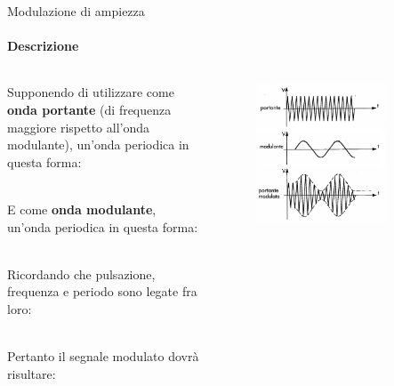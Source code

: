 \documentclass[aspectratio=169]{beamer}
\newcommand*{\vet}{\fontfamily{qzc}\selectfont}
\begin{document}
\begin{frame}{Modulazione di ampiezza}
	\framesubtitle{Descrizione}
	
	\begin{columns}
		\begin{column}{0.6\textwidth}
			Supponendo di utilizzare come \textbf{onda portante} (di frequenza maggiore rispetto all'onda modulante), un'onda periodica in questa forma:\\
			\smallskip
			\\
			\smallskip
			\raggedright{E come \textbf{onda modulante}, un'onda periodica in questa forma:}\\
			\smallskip
			\\
			\smallskip
			\raggedright{Ricordando che pulsazione, frequenza e periodo sono legate fra loro:}\\
			\smallskip
			\centering{{\vet f} = $\frac{1}{T}$\quad$\omega = 2 \pi$ {\vet f} = $\frac{2\pi}{T}$}\\
			\smallskip
			\raggedright{Pertanto il segnale modulato dovrà risultare:}\\
			\smallskip
			\\
		\end{column}
		\begin{column}{0.4\textwidth}
			\begin{figure}
			\raggedright
			\includegraphics[width=0.8\textwidth]{Imgs/Modulante}
			\end{figure}
		\end{column}
	\end{columns}
	\end{frame}
\end{document}
